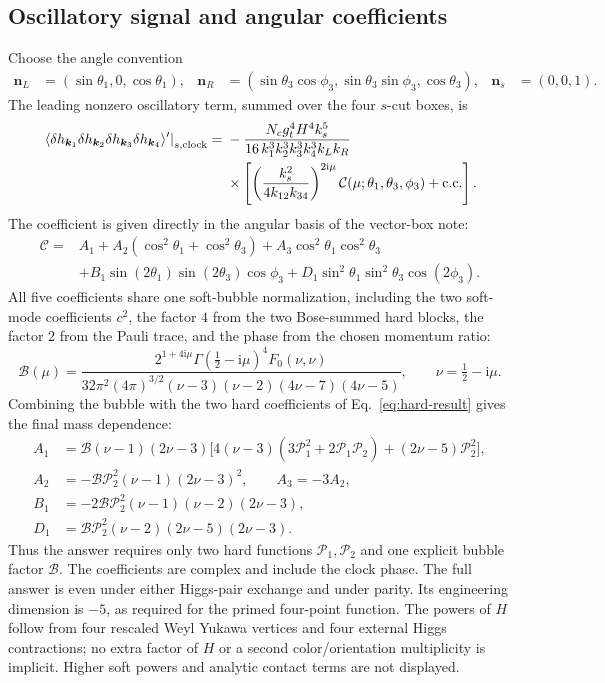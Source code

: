 \documentclass[a4paper,12pt]{article}
\newcommand{\ii}{\mathrm i}
\newcommand{\bk}{\bm k}
\newcommand{\cC}{\mathcal C}
\begin{document}
\subsection{Oscillatory signal and angular coefficients}
Choose the angle convention
\begin{align}
 \bm n_L&=(\sin\theta_1,0,\cos\theta_1),&
 \bm n_R&=(\sin\theta_3\cos\phi_3,\sin\theta_3\sin\phi_3,\cos\theta_3),&
 \bm n_s&=(0,0,1).
\end{align}
The leading nonzero oscillatory term, summed over the four $s$-cut boxes, is
\begin{align}
 \left.\langle\delta h_{\bk_1}\delta h_{\bk_2}\delta h_{\bk_3}\delta h_{\bk_4}\rangle'
 \right|_{s,\rm clock}
 ={}&-\frac{N_cg_t^4H^4 k_s^5}{16\,k_1^3k_2^3k_3^3k_4^3 k_Lk_R}\nonumber\\
 &\times\left[\left(\frac{k_s^2}{4k_{12}k_{34}}\right)^{2\ii\mu}
 \cC(\mu;\theta_1,\theta_3,\phi_3)+\mathrm{c.c.}\right].
 \label{eq:final}
\end{align}
The coefficient is given directly in the angular basis of the vector-box note:
\begin{align}
 \cC={}&A_1+A_2(\cos^2\theta_1+\cos^2\theta_3)
 +A_3\cos^2\theta_1\cos^2\theta_3\nonumber\\
 &+B_1\sin(2\theta_1)\sin(2\theta_3)\cos\phi_3
 +D_1\sin^2\theta_1\sin^2\theta_3\cos(2\phi_3).
 \label{eq:angular-final}
\end{align}
All five coefficients share one soft-bubble normalization, including the two
soft-mode coefficients $c^2$, the factor $4$ from the two Bose-summed hard blocks, the factor $2$ from the Pauli trace, and the phase from the chosen momentum ratio:
\begin{equation}
 \mathcal B(\mu)=
 \frac{2^{1+4\ii\mu}\Gamma(\tfrac12-\ii\mu)^4 F_0(\nu,\nu)}
 {32\pi^2(4\pi)^{3/2}(\nu-3)(\nu-2)(4\nu-7)(4\nu-5)},\qquad
 \nu=\tfrac12-\ii\mu.
 \label{eq:bubble-normalization}
\end{equation}
Combining the bubble with the two hard coefficients of Eq.~\eqref{eq:hard-result}
gives the final mass dependence:
\begin{align}
 A_1&=\mathcal B(\nu-1)(2\nu-3)
 \big[4(\nu-3)(3\mathcal P_1^2+2\mathcal P_1\mathcal P_2)
 +(2\nu-5)\mathcal P_2^2\big],\\
 A_2&=-\mathcal B\mathcal P_2^2(\nu-1)(2\nu-3)^2,\qquad A_3=-3A_2,\\
 B_1&=-2\mathcal B\mathcal P_2^2(\nu-1)(\nu-2)(2\nu-3),\\
 D_1&=\mathcal B\mathcal P_2^2(\nu-2)(2\nu-5)(2\nu-3).
 \label{eq:compact-coefficients}
\end{align}
Thus the answer requires only two hard functions $\mathcal P_1,\mathcal P_2$
and one explicit bubble factor $\mathcal B$. The coefficients are complex and
include the clock phase. The full answer is even under either Higgs-pair exchange
and under parity. Its engineering dimension is $-5$, as required for the primed
four-point function. The powers of $H$ follow from four rescaled Weyl Yukawa
vertices and four external Higgs contractions; no extra factor of $H$ or a
second color/orientation multiplicity is implicit. Higher soft powers and
analytic contact terms are not displayed.
\end{document}
